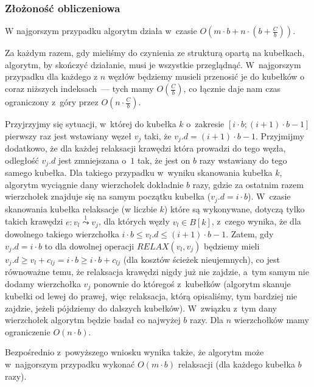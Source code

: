\subsubsection{Złożoność obliczeniowa}


W najgorszym przypadku algorytm działa w~czasie $O \left( m \cdot b + n \cdot \left( b + \frac{C}{b}\right) \right)$.

\begin{myitemize}
	\item Za każdym razem, gdy mieliśmy do czynienia ze strukturą opartą na kubełkach, algorytm, by skończyć działanie, musi je wszystkie przeglądnąć.
	W~najgorszym przypadku dla każdego z $n$ węzłów będziemy musieli przenosić je do kubełków o coraz niższych indeksach~--- tych mamy $O \left( \frac{C}{b} \right)$, co łącznie daje nam czas ograniczony z~góry przez $O \left( n \cdot \frac{C}{b} \right)$.
	\item Przyjrzyjmy się sytuacji, w~której do kubełka $k$ o~zakresie $\left[ i \cdot b ; \left( i + 1 \right) \cdot b - 1 \right]$ pierwszy raz jest wstawiany węzeł $v_{j}$ taki, że $v_{j}.d = \left( i + 1 \right) \cdot b - 1$.
	Przyjmijmy dodatkowo, że dla każdej relaksacji krawędzi która prowadzi do tego węzła, odległość $v_{j}.d$ jest zmniejszana o~$1$ tak, że jest on $b$ razy wstawiany do tego samego kubełka.
	Dla takiego przypadku w~wyniku skanowania kubełka $k$, algorytm wyciągnie dany wierzchołek dokładnie $b$ razy, gdzie za ostatnim razem wierzchołek znajduje się na samym początku kubełka ($v_{j}.d = i \cdot b$).
	W~czasie skanowania kubełka relaksacje (w liczbie $k$) które są wykonywane, dotyczą tylko takich krawędzi $e : v_{l} \overset{1}\leadsto v_{j}$, dla których węzły $v_{l} \in B \left[ k \right]$, z~czego wynika, że dla dowolnego takiego wierzchołka $i \cdot b \leqslant v_{l}.d \leqslant \left( i + 1 \right) \cdot b - 1$.
	Zatem, gdy $v_{j}.d = i \cdot b$ to dla dowolnej operacji $RELAX \left( v_{l}, v_{j} \right)$ będziemy mieli $ v_{j}.d \geqslant v_{l} + c_{lj} = i \cdot b \geqslant i \cdot b + c_{lj}$ (dla kosztów ścieżek nieujemnych), co jest równoważne temu, że relaksacja krawędzi nigdy już nie zajdzie, a~tym samym nie dodamy wierzchołka $v_{j}$ ponownie do któregoś z~kubełków (algorytm skanuje kubełki od lewej do prawej, więc relaksacja, którą opisaliśmy, tym bardziej nie zajdzie, jeżeli pójdziemy do dalszych kubełków).
	W~związku z~tym dany wierzchołek algorytm będzie badał co najwyżej $b$ razy.
	Dla $n$ wierzchołków mamy ograniczenie $O \left( n \cdot b \right)$.
	\item Bezpośrednio z~powyższego wniosku wynika także, że algorytm może w~najgorszym przypadku wykonać $O \left( m \cdot b \right)$ relaksacji (dla każdego kubełka $b$ razy).
\end{myitemize}

